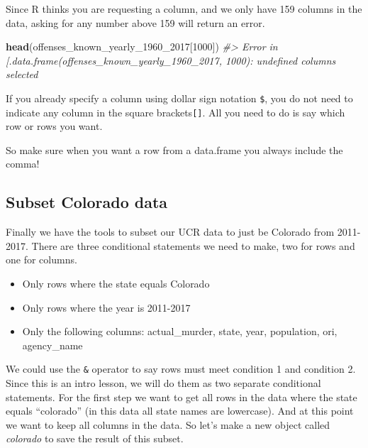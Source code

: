 \documentclass[
  12pt,
]{book}
\newenvironment{Shaded}{\begin{snugshade}}{\end{snugshade}}
\newcommand{\CommentTok}[1]{\textcolor[rgb]{0.37,0.37,0.37}{\textit{#1}}}
\newcommand{\DecValTok}[1]{\textcolor[rgb]{0.06,0.06,0.06}{#1}}
\newcommand{\KeywordTok}[1]{\textcolor[rgb]{0.27,0.27,0.27}{\textbf{#1}}}
\newcommand{\NormalTok}[1]{#1}
\newcommand{\OperatorTok}[1]{\textcolor[rgb]{0.43,0.43,0.43}{\textbf{#1}}}
\providecommand{\tightlist}{%
  \setlength{\itemsep}{0pt}\setlength{\parskip}{0pt}}
\begin{document}
Since R thinks you are requesting a column, and we only have 159 columns in the data, asking for any number above 159 will return an error.

\begin{Shaded}
\begin{Highlighting}[]
\KeywordTok{head}\NormalTok{(offenses\_known\_yearly\_}\DecValTok{1960}\NormalTok{\_}\DecValTok{2017}\NormalTok{[}\DecValTok{1000}\NormalTok{])}
\CommentTok{\#\textgreater{} Error in \textasciigrave{}[.data.frame\textasciigrave{}(offenses\_known\_yearly\_1960\_2017, 1000): undefined columns selected}
\end{Highlighting}
\end{Shaded}

If you already specify a column using dollar sign notation \texttt{\$}, you do not need to indicate any column in the square brackets\texttt{{[}{]}}. All you need to do is say which row or rows you want.

\begin{Shaded}
\end{Shaded}

So make sure when you want a row from a data.frame you always include the comma!

\hypertarget{subset-colorado-data}{%
\subsection{Subset Colorado data}\label{subset-colorado-data}}

Finally we have the tools to subset our UCR data to just be Colorado from 2011-2017. There are three conditional statements we need to make, two for rows and one for columns.

\begin{itemize}
\tightlist
\item
  Only rows where the state equals Colorado
\item
  Only rows where the year is 2011-2017
\item
  Only the following columns: actual\_murder, state, year, population, ori, agency\_name
\end{itemize}

We could use the \texttt{\&} operator to say rows must meet condition 1 and condition 2. Since this is an intro lesson, we will do them as two separate conditional statements. For the first step we want to get all rows in the data where the state equals ``colorado'' (in this data all state names are lowercase). And at this point we want to keep all columns in the data. So let's make a new object called \emph{colorado} to save the result of this subset.
\end{document}
